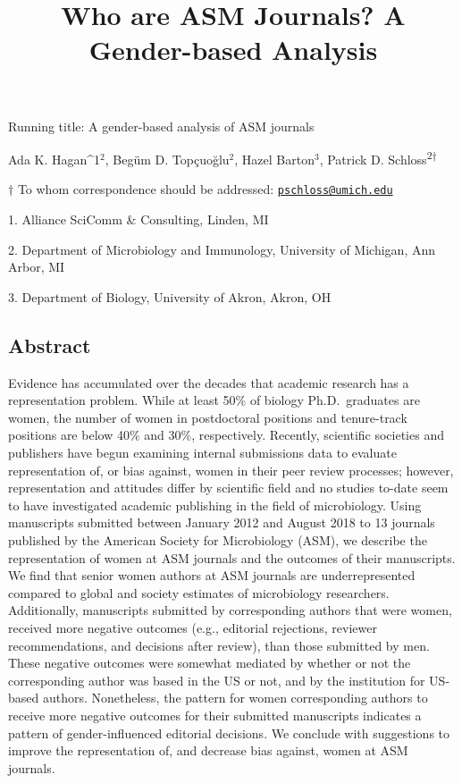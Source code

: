 \documentclass[11pt,]{article}
\title{\textbf{Who are ASM Journals? A Gender-based Analysis}}
\author{}
\date{}
\begin{document}
\maketitle

\vspace{35mm}

Running title: A gender-based analysis of ASM journals

\vspace{35mm}

Ada K. Hagan\^{}1\({^2}\), Begüm D. Topçuoğlu\({^2}\), Hazel
Barton\({^3}\), Patrick D. Schloss\textsuperscript{2\(\dagger\)}

\vspace{40mm}

\(\dagger\) To whom correspondence should be addressed:
\href{mailto:pschloss@umich.edu}{\nolinkurl{pschloss@umich.edu}}

1. Alliance SciComm \& Consulting, Linden, MI

2. Department of Microbiology and Immunology, University of Michigan,
Ann Arbor, MI

3. Department of Biology, University of Akron, Akron, OH

\newpage

\linenumbers

\subsection{Abstract}\label{abstract}

Evidence has accumulated over the decades that academic research has a
representation problem. While at least 50\% of biology Ph.D.~graduates
are women, the number of women in postdoctoral positions and
tenure-track positions are below 40\% and 30\%, respectively. Recently,
scientific societies and publishers have begun examining internal
submissions data to evaluate representation of, or bias against, women
in their peer review processes; however, representation and attitudes
differ by scientific field and no studies to-date seem to have
investigated academic publishing in the field of microbiology. Using
manuscripts submitted between January 2012 and August 2018 to 13
journals published by the American Society for Microbiology (ASM), we
describe the representation of women at ASM journals and the outcomes of
their manuscripts. We find that senior women authors at ASM journals are
underrepresented compared to global and society estimates of
microbiology researchers. Additionally, manuscripts submitted by
corresponding authors that were women, received more negative outcomes
(e.g., editorial rejections, reviewer recommendations, and decisions
after review), than those submitted by men. These negative outcomes were
somewhat mediated by whether or not the corresponding author was based
in the US or not, and by the institution for US-based authors.
Nonetheless, the pattern for women corresponding authors to receive more
negative outcomes for their submitted manuscripts indicates a pattern of
gender-influenced editorial decisions. We conclude with suggestions to
improve the representation of, and decrease bias against, women at ASM
journals.
\end{document}
